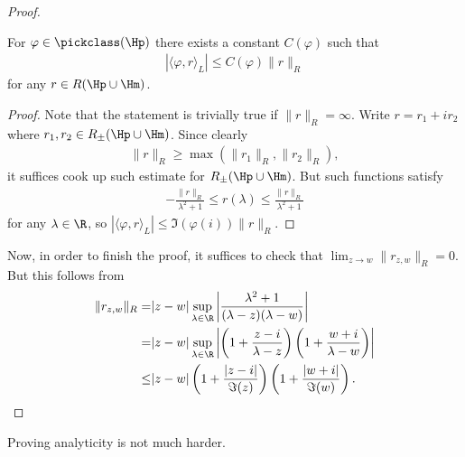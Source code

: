 \begin{proof}
	\begin{lem}\label{pick_norm_estimate}
		For $\varphi \in \pickclass(\Hp)$ there exists a constant $C(\varphi)$ such that
		\begin{align*}
			\left|\langle \varphi, r \rangle_{L}\right| \leq C(\varphi) \|r\|_{R}
		\end{align*}
		for any $r \in R(\Hp \cup \Hm)$.
	\end{lem}
	\begin{proof}
		Note that the statement is trivially true if $\|r\|_{R} = \infty$. Write $r = r_{1} + i r_{2}$ where $r_{1}, r_{2} \in R_{\pm}(\Hp \cup \Hm)$. Since clearly
		\begin{align*}
			\|r\|_{R} \geq \max(\|r_{1}\|_{R}, \|r_{2}\|_{R}),
		\end{align*}
		it suffices cook up such estimate for $R_{\pm}(\Hp \cup \Hm)$. But such functions satisfy
		\begin{align*}
			-\frac{\|r\|_{R}}{\lambda^2 + 1} \leq r(\lambda) \leq \frac{\|r\|_{R}}{\lambda^2 + 1} 
		\end{align*}
		for any $\lambda \in \R$, so $\left|\langle \varphi, r \rangle_{L}\right| \leq \Im(\varphi(i)) \|r\|_{R}$.
	\end{proof}

	Now, in order to finish the proof, it suffices to check that $\lim_{z \to w}\|r_{z, w}\|_{R} = 0$. But this follows from
	\begin{align*}
		\|r_{z, w}\|_{R} = & |z - w| \sup_{\lambda \in \R}\left|\frac{\lambda^2 + 1}{(\lambda - z) (\lambda - w)}\right| \\
		= & |z - w| \sup_{\lambda \in \R}\left|\left(1 + \frac{z - i}{\lambda - z}\right) \left(1 + \frac{w + i}{\lambda - w}\right)\right| \\
		\leq & |z - w| \left(1 + \frac{|z - i|}{\Im(z)}\right) \left(1 + \frac{|w + i|}{\Im(w)}\right).
	\end{align*}
\end{proof}

Proving analyticity is not much harder.


